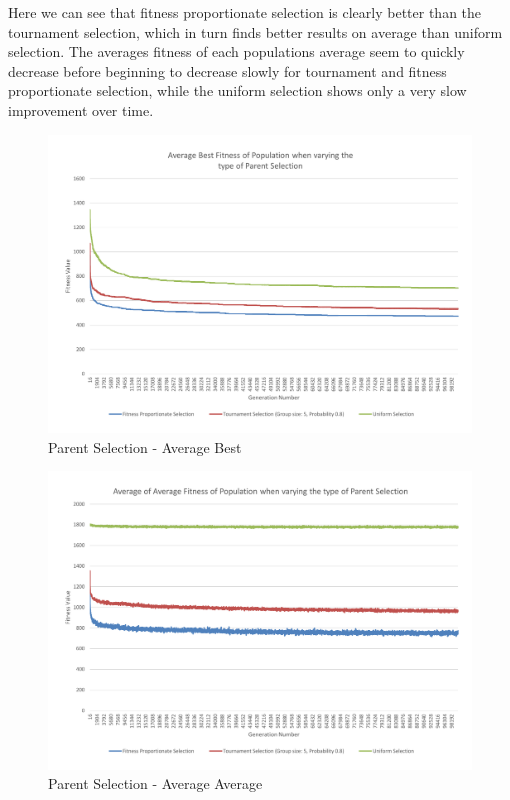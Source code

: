 Here we can see that fitness proportionate selection is clearly better than the tournament selection, which in turn finds better results on average than uniform selection. The averages fitness of each populations average seem to quickly decrease before beginning to decrease slowly for tournament and fitness proportionate selection, while the uniform selection shows only a very slow improvement over time.

\begin{figure}[thbp]
	\centerline{\includegraphics[width=\paperwidth]{figures/CircleTests/CircleTestParentSelectionAverageBest.pdf}}
	\caption{Parent Selection - Average Best}
\end{figure}

\begin{figure}[thbp]
	\centerline{\includegraphics[width=\paperwidth]{figures/CircleTests/CircleTestParentSelectionAverageAverage.pdf}}
	\caption{Parent Selection - Average Average}
\end{figure}

